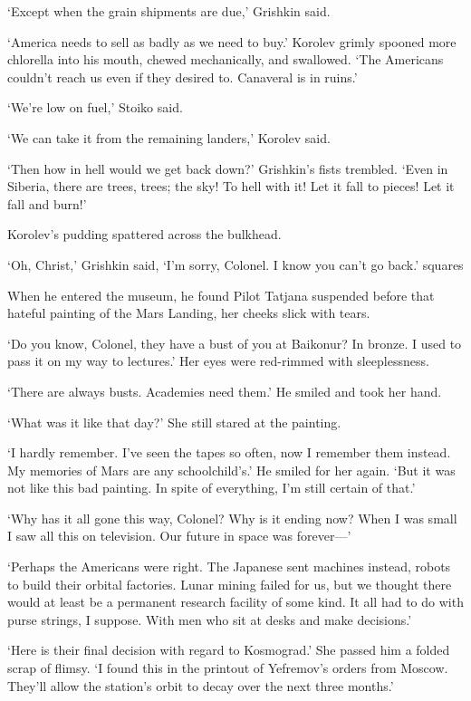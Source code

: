 `Except when the grain shipments are due,' Grishkin said.

`America needs to sell as badly as we need to buy.' Korolev grimly spooned more chlorella into his mouth, chewed mechanically, and swallowed. `The Americans couldn't reach us even if they desired to. Canaveral is in ruins.'

`We're low on fuel,' Stoiko said.

`We can take it from the remaining landers,' Korolev said.

`Then how in hell would we get back down?' Grishkin's fists trembled. `Even in Siberia, there are trees, trees; the sky! To hell with it! Let it fall to pieces! Let it fall and burn!'

Korolev's pudding spattered across the bulkhead.

`Oh, Christ,' Grishkin said, `I'm sorry, Colonel. I know you can't go back.'
squares

When he entered the museum, he found Pilot Tatjana suspended before that hateful painting of the Mars Landing, her cheeks slick with tears.

`Do you know, Colonel, they have a bust of you at Baikonur? In bronze. I used to pass it on my way to lectures.' Her eyes were red-rimmed with sleeplessness.

`There are always busts. Academies need them.' He smiled and took her hand.

`What was it like that day?' She still stared at the painting.

`I hardly remember. I've seen the tapes so often, now I remember them instead. My memories of Mars are any schoolchild's.' He smiled for her again. `But it was not like this bad painting. In spite of everything, I'm still certain of that.'

`Why has it all gone this way, Colonel? Why is it ending now? When I was small I saw all this on television. Our future in space was forever---'

`Perhaps the Americans were right. The Japanese sent machines instead, robots to build their orbital factories. Lunar mining failed for us, but we thought there would at least be a permanent research facility of some kind. It all had to do with purse strings, I suppose. With men who sit at desks and make decisions.'

`Here is their final decision with regard to Kosmograd.' She passed him a folded scrap of flimsy. `I found this in the printout of Yefremov's orders from Moscow. They'll allow the station's orbit to decay over the next three months.'

